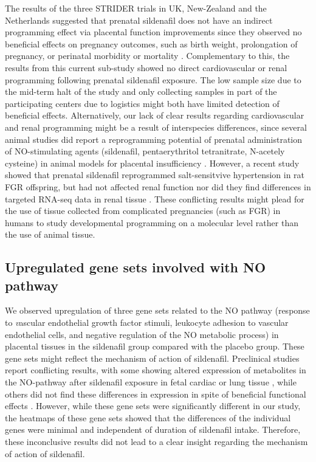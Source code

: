 \documentclass[authordate, empirical]{jote-new-article}
\begin{document}
	The results of the three STRIDER trials in UK, New-Zealand and the Netherlands suggested that prenatal sildenafil does not have an indirect programming effect via placental function improvements since they observed no beneficial effects on pregnancy outcomes, such as birth weight, prolongation of pregnancy, or perinatal morbidity or mortality \parencites{Groom2019}{Sharp2018}{Pels2020}. Complementary to this, the results from this current sub-study showed no direct cardiovascular or renal programming following prenatal sildenafil exposure. The low sample size due to the mid-term halt of the study and only collecting samples in part of the participating centers due to logistics might both have limited detection of beneficial effects. Alternatively, our lack of clear results regarding cardiovascular and renal programming might be a result of interspecies differences, since several animal studies did report a reprogramming potential of prenatal administration of NO-stimulating agents (sildenafil, pentaerythritol tetranitrate, N-acetely cysteine) in animal models for placental insufficiency \parencites{Herrera2017}{Itani2017}{Wu2015}. However, a recent study showed that prenatal sildenafil reprogrammed salt-sensitvive hypertension in rat FGR offspring, but had not affected renal function nor did they find differences in targeted RNA-seq data in renal tissue \parencites{Turbeville2020}. These conflicting results might plead for the use of tissue collected from complicated pregnancies (such as FGR) in humans to study developmental programming on a molecular level rather than the use of animal tissue.







	\subsection{Upregulated gene sets involved with NO pathway }



	We observed upregulation of three gene sets related to the NO pathway (response to \emph{v}ascular endothelial growth factor stimuli, leukocyte adhesion to vascular endothelial cells, and negative regulation of the NO metabolic process) in placental tissues in the sildenafil group compared with the placebo group. These gene sets might reflect the mechanism of action of sildenafil. Preclinical studies report conflicting results, with some showing altered expression of metabolites in the NO-pathway after sildenafil exposure in fetal cardiac or lung tissue \parencites{Itani2017}{Shue2014}, while others did not find these differences in expression in spite of beneficial functional effects \parencites{George2013}. However, while these gene sets were significantly different in our study, the heatmaps of these gene sets showed that the differences of the individual genes were minimal and independent of duration of sildenafil intake. Therefore, these inconclusive results did not lead to a clear insight regarding the mechanism of action of sildenafil.
\end{document}
